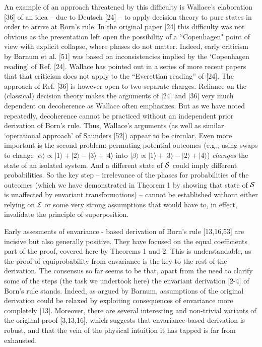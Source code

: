 \documentclass[aps,pra,epsfig,11pt,floatfix]{revtex4}
\begin{document}
An example of an approach threatened by this difficulty is Wallace's
elaboration [36] of an idea -- due to Deutsch [24] -- to apply decision
theory to pure states in order to arrive at Born's rule. In the original
paper [24] this difficulty was not obvious as the presentation left open the
possibility of a ``Copenhagen" point of view with explicit collapse, where
phases do not matter. Indeed, early criticism by Barnum et al. [51] was based
on inconsistencies implied by the `Copenhagen reading' of Ref. [24]. Wallace
has pointed out in a series of more recent papers that that criticism does not
apply to the ``Everettian reading'' of [24]. The approach of Ref. [36]
is however open to two separate charges. Reliance on the (classical) decision
theory makes the arguments of [24] and [36] very much dependent on decoherence
as Wallace often emphasizes. But as we have noted repeatedly, decoherence
cannot be practiced without an independent prior derivation of Born's rule.
Thus, Wallace's arguments (as well as similar `operational approach' of
Saunders [52]) appear to be circular. Even more important is the second
problem: permuting potential outcomes (e.g., using swaps to change
$|\alpha\rangle \propto |1\rangle +|2\rangle-|3\rangle+|4\rangle$ into
$|\beta\rangle \propto |1\rangle +|3\rangle-|2\rangle+|4\rangle$) {\it changes}
the state of an isolated system. And a different state of ${\cal S}$ could
imply different probabilities. So the key step -- irrelevance of the phases for
probabilities of the outcomes (which we have demonstrated in Theorem 1 by
showing that state of ${\cal S}$ is unaffected by envariant transformations)
-- cannot be established without either relying on ${\cal E}$ or some very
strong assumptions that would have to, in effect, invalidate the principle of
superposition.

Early assesments of envariance - based derivation of Born's rule [13,16,53]
are incisive but also generally positive. They have focused on 
the equal coefficients part of the proof, covered here by Theorems 1 and 2. 
This is understandable, as the proof of equiprobability from envariance
is  the key to the rest of the derivation. The consensus so far seems to be
that, apart from the need to clarify some of the steps (the task we undertook 
here) the envariant derivation [2-4] of Born's rule stands.
Indeed, as argued by Barnum, assumptions of the original derivation could be
relaxed by exploiting consequences of envariance more completely [13].
Moreover, there are several interesting and non-trivial variants of the original
proof [3,13,16], which suggests that envariance-based derivation is robust,
and that the vein of the physical intuition it has tapped is far from exhausted.
\end{document}

